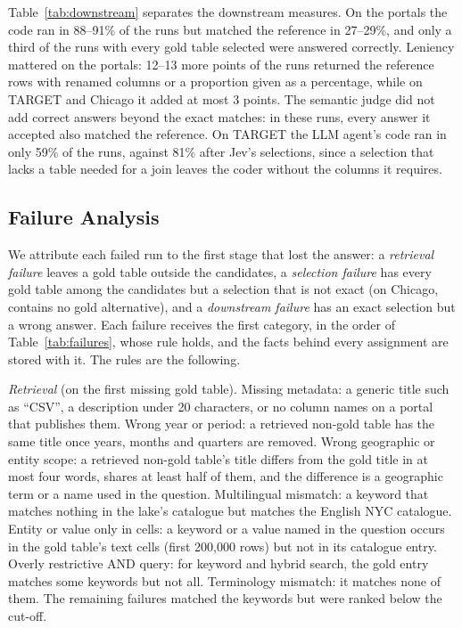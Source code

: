Table~\ref{tab:downstream} separates the downstream measures. On the portals
the code ran in 88--91\% of the runs but matched the reference in 27--29\%,
and only a third of the runs with every gold table selected were answered
correctly. Leniency mattered on the portals: 12--13 more points of the runs
returned the reference rows with renamed columns or a proportion given as a
percentage, while on TARGET and Chicago it added at most 3 points. The
semantic judge did not add correct answers beyond the exact matches: in these
runs, every answer it accepted also matched the reference. On TARGET the LLM
agent's code ran in only 59\% of the runs, against 81\% after Jev's
selections, since a selection that lacks a table needed for a join leaves the
coder without the columns it requires.

\subsection{Failure Analysis}
\label{sec:failure-analysis}

We attribute each failed run to the first stage that lost the answer: a
\emph{retrieval failure} leaves a gold table outside the candidates, a
\emph{selection failure} has every gold table among the candidates but a
selection that is not exact (on Chicago, contains no gold alternative), and a
\emph{downstream failure} has an exact selection but a wrong answer. Each
failure receives the first category, in the order of Table~\ref{tab:failures},
whose rule holds, and the facts behind every assignment are stored with it. The
rules are the following.

\emph{Retrieval} (on the first missing gold table). Missing metadata: a
generic title such as ``CSV'', a description under 20 characters, or no column
names on a portal that publishes them. Wrong year or period: a retrieved
non-gold table has the same title once years, months and quarters are
removed. Wrong geographic or entity scope: a retrieved non-gold table's title
differs from the gold title in at most four words, shares at least half of
them, and the difference is a geographic term or a name used in the question.
Multilingual mismatch: a keyword that matches nothing in the lake's catalogue
but matches the English NYC catalogue. Entity or value only in cells: a
keyword or a value named in the question occurs in the gold table's text
cells (first 200{,}000 rows) but not in its catalogue entry. Overly restrictive
AND query: for keyword and hybrid search, the gold entry matches some keywords
but not all. Terminology mismatch: it matches none of them. The remaining
failures matched the keywords but were ranked below the cut-off.

